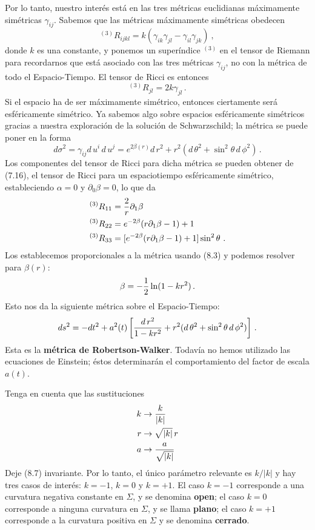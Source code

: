 \documentclass[11pt,b5paper,openany,twoside]{book}
\newcommand{\p}[1]{{\partial_{#1}}}
\begin{document}
Por lo tanto, nuestro interés está en las tres métricas euclidianas máximamente simétricas $\gamma_{ij}$.
Sabemos que las métricas máximamente simétricas obedecen
\begin{equation}
^{(3)}R_{ijkl} = k(\gamma_{ik}\gamma_{jl}
-\gamma_{il}\gamma_{jk})\ ,\label{8.2}
\end{equation}
donde $k$ es una constante, y ponemos un superíndice $^{(3)}$ en el tensor de Riemann para recordarnos que está asociado con las tres métricas $\gamma_{ij}$, no con la métrica de todo el Espacio-Tiempo.
El tensor de Ricci es entonces
\begin{equation}
^{(3)}R_{jl} = 2k\gamma_{jl}\,.\label{8.3}
\end{equation}
Si el espacio ha de ser máximamente simétrico, entonces ciertamente será esféricamente simétrico.
Ya sabemos algo sobre espacios esféricamente simétricos gracias a nuestra exploración de la solución de Schwarzschild; la métrica se puede poner en la forma
\begin{equation}
d\sigma^2 = \gamma_{ij} d\,u^i\, d\,u^j =
e^{2\beta(r)} d\,r^2 + r^2( d\,\theta^2 +
\sin^2\theta\, d\,\phi^2)\,.\label{8.4}
\end{equation}
Los componentes del tensor de Ricci para dicha métrica se pueden obtener de (7.16), el tensor de Ricci para un espaciotiempo esféricamente simétrico, estableciendo $\alpha=0$ y $\p0\beta=0$, lo que da
\begin{align}
^{(3)}R_{11}  &=  {2\over r}\p1\beta \notag \\
^{(3)}R_{22}  &=  e^{-2\beta}(r\p1 \beta-1)+1 \notag \\
^{(3)}R_{33}  &=  [e^{-2\beta}(r\p1 \beta-1)+1]\sin^2\theta\, \,.
\label{8.5}
\end{align}
Los establecemos proporcionales a la métrica usando (8.3) y podemos resolver para $\beta(r)$:
\begin{equation}
\beta = -{1\over 2}\ln(1-kr^2)\,.\label{8.6}
\end{equation}
Esto nos da la siguiente métrica sobre el Espacio-Tiempo:
\begin{equation}
ds^2 = -dt^2 + a^2(t)\left[{{ d\,r^2}\over{1-kr^2}}
+ r^2( d\,\theta^2 +\sin^2\theta\, d\,\phi^2)\right]\,.\label{8.7}
\end{equation}
Esta es la {\bf métrica de Robertson-Walker}.
Todavía no hemos utilizado las ecuaciones de Einstein; éstos determinarán el comportamiento del factor de escala $a(t)$.

Tenga en cuenta que las sustituciones
\begin{align}
k&\rightarrow{k\over{|k|}} \notag \\
r &\rightarrow \sqrt{|k|}\, r \notag \\
a &\rightarrow{a\over{\sqrt{|k|}}}\label{8.8}
\end{align}
Deje (8.7) invariante.
Por lo tanto, el único parámetro relevante es $k/|k|$ y hay tres casos de interés: $k=-1$, $k=0$ y $k=+1$.
El caso $k=-1$ corresponde a una curvatura negativa constante en $\Sigma$, y se denomina {\bf open}; el caso $k=0$ corresponde a ninguna curvatura en $\Sigma$, y se llama {\bf plano}; el caso $k=+1$ corresponde a la curvatura positiva en $\Sigma$ y se denomina {\bf cerrado}.
\end{document}
